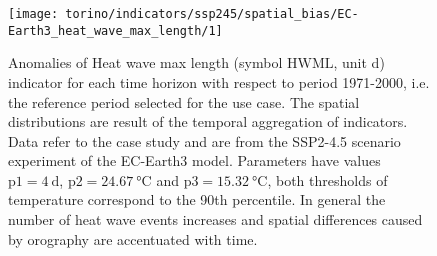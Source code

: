 \begin{figure}
  \centering
  \texttt{[image: torino/indicators/ssp245/spatial\_bias/EC-Earth3\_heat\_wave\_max\_length/1]}
  \caption{Anomalies of {Heat wave max length} (symbol $\mathrm{HWML}$, unit \unit{\day}) indicator for each time horizon with respect to period 1971-2000, i.e. the reference period selected for the use case. The spatial distributions are result of the temporal aggregation of indicators. Data refer to the case study and are from the SSP2-4.5 scenario experiment of the EC-Earth3 model. Parameters have values $\mathrm{p1} = \qty{4}{\day}$, $\mathrm{p2} = \qty{24.67}{\degreeCelsius}$ and $\mathrm{p3} = \qty{15.32}{\degreeCelsius}$, both thresholds of temperature correspond to the 90th percentile. In general the number of heat wave events increases and spatial differences caused by orography are accentuated with time.}
  \label{fig:spatial_bias_EC-Earth3_heat_wave_max_length}
\end{figure}



